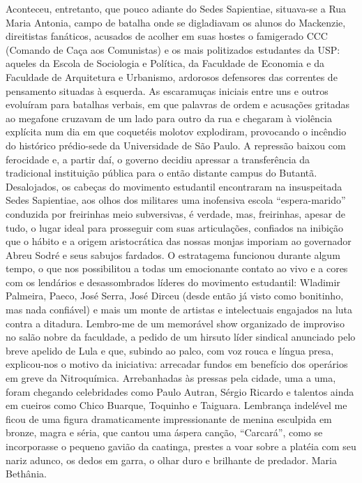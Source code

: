 Aconteceu, entretanto, que pouco adiante do Sedes Sapientiae, situava-se a Rua Maria Antonia, campo de batalha onde se digladiavam os alunos do Mackenzie, direitistas fanáticos, acusados de acolher em suas hostes o famigerado CCC (Comando de Caça aos Comunistas) e os mais politizados estudantes da USP: aqueles da Escola de Sociologia e Política, da Faculdade de Economia e da Faculdade de Arquitetura e Urbanismo, ardorosos defensores das correntes de pensamento situadas à esquerda.
As escaramuças iniciais entre uns e outros evoluíram para batalhas verbais, em que palavras de ordem e acusações gritadas ao megafone cruzavam de um lado para outro da rua e chegaram à violência explícita num dia em que coquetéis molotov explodiram, provocando o incêndio do histórico prédio-sede da Universidade de São Paulo.
A repressão baixou com ferocidade e, a partir daí, o governo decidiu apressar a transferência da tradicional instituição pública para o então distante campus do Butantã.
Desalojados, os cabeças do movimento estudantil encontraram na insuspeitada Sedes Sapientiae, aos olhos dos militares uma inofensiva escola ``espera-marido'' conduzida por freirinhas meio subversivas, é verdade, mas, freirinhas, apesar de tudo, o lugar ideal para prosseguir com suas articulações, confiados na inibição que o hábito e a origem aristocrática das nossas monjas imporiam ao governador Abreu Sodré e seus sabujos fardados.
O estratagema funcionou durante algum tempo, o que nos possibilitou a todas um emocionante contato ao vivo e a cores com os lendários e desassombrados líderes do movimento estudantil: Wladimir Palmeira, Paeco, José Serra, José Dirceu (desde então já visto como bonitinho, mas nada confiável) e mais um monte de artistas e intelectuais engajados na luta contra a ditadura.
Lembro-me de um memorável show organizado de improviso no salão nobre da faculdade, a pedido de um hirsuto líder sindical anunciado pelo breve apelido de Lula e que, subindo ao palco, com voz rouca e língua presa, explicou-nos o motivo da iniciativa: arrecadar fundos em benefício dos operários em greve da Nitroquímica.
 Arrebanhadas às pressas pela cidade, uma a uma, foram chegando celebridades como Paulo Autran, Sérgio Ricardo e talentos ainda em cueiros como Chico Buarque, Toquinho e Taiguara.
Lembrança indelével me ficou de uma figura dramaticamente impressionante de menina esculpida em bronze, magra e séria, que cantou uma áspera canção, ``Carcará'', como se incorporasse o pequeno gavião da caatinga, prestes a voar sobre a platéia com seu nariz adunco, os dedos em garra, o olhar duro e brilhante de predador.
Maria Bethânia.


